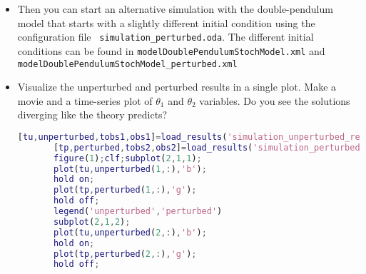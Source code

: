 \begin{itemize}
\ifshowmatlab
      To create a time-series plot in Matlab type:
      \begin{lstlisting}[language=Matlab,frame=single,caption={Matlab}]
       subplot(2,1,1);
       plot(t,unperturbed(1,:),'b-');
       ylabel('\theta_1');
       subplot(2,1,2);
       plot(t,unperturbed(2,:),'b-');
       ylabel('\theta_2');
       xlabel('time');
      \end{lstlisting}
\fi
      
      To create a time-series plot in Python type:
      \begin{lstlisting}[language=Python,frame=single,caption={Python}]
      plt.subplot(2,1,1)
      plt.plot(unperturbed.model_time,unperturbed.x[:,0],"b") #python counts starting at 0
      plt.ylabel(r"$\theta_1$") # use latex for label
      plt.subplot(2,1,2)
      plt.plot(unperturbed.model_time,unperturbed.x[:,1],"b")
      plt.ylabel(r"$\theta_2$")
      plt.show() 
      #only needed if interactive plotting is off. 
      #Set with plt.ioff(), plt.ion()
      \end{lstlisting}
%


\item Then you can start an alternative simulation with the double-pendulum model that
       starts with a slightly different initial condition using the
       configuration file \texttt{ simulation\_perturbed.oda}. The different initial conditions
       can be found in \texttt{model\/DoublePendulumStochModel.xml} and \\
       \texttt{model\/DoublePendulumStochModel\_perturbed.xml}

\item  Visualize the unperturbed and perturbed results in a single plot. Make
       a movie and a time-series plot of $\theta_1$ and $\theta_2$ variables. Do you see
       the solutions diverging like the theory predicts?
       
\ifshowmatlab
      \begin{lstlisting}[language=Matlab,frame=single,caption={Matlab}]
       [tu,unperturbed,tobs1,obs1]=load_results('simulation_unperturbed_results');
       [tp,perturbed,tobs2,obs2]=load_results('simulation_perturbed_results');
       figure(1);clf;subplot(2,1,1);
       plot(tu,unperturbed(1,:),'b');
       hold on;
       plot(tp,perturbed(1,:),'g');
       hold off;
       legend('unperturbed','perturbed')
       subplot(2,1,2);
       plot(tu,unperturbed(2,:),'b');
       hold on;
       plot(tp,perturbed(2,:),'g');
       hold off;
      \end{lstlisting}
\fi
      

\end{itemize}
